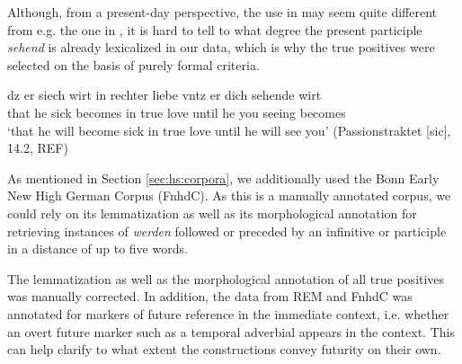 \documentclass[output=paper,colorlinks,citecolor=brown]{langscibook}
\begin{document}
Although, from a present-day perspective, the use in  may seem quite different from e.g. the one in , it is hard to tell to what degree the present participle \textit{sehend} is already lexicalized in our data, which is why the true positives were selected on the basis of purely formal criteria. 

\ea \label{ex:hs:liebesehend}
\gll dz er siech wirt in rechter liebe vntz er dich sehende wirt \\
that he sick becomes in true love until he you seeing becomes \\
\glt `that he will become sick in true love until he will see you' (Passionstraktet [sic], 14.2, REF)
\z

As mentioned in Section \ref{sec:hs:corpora}, we additionally used the Bonn Early New High German Corpus (FnhdC). As this is a manually annotated corpus, we could rely on its lemmatization as well as its morphological annotation for retrieving instances of \textit{werden} followed or preceded by an infinitive or participle in a distance of up to five words. 

The lemmatization as well as the morphological annotation of all true positives was manually corrected. In addition, the data from REM and FnhdC was annotated for markers of future reference in the immediate context, i.e. whether an overt future marker such as a temporal adverbial appears in the context. This can help clarify to what extent the constructions convey futurity on their own.


\begin{table}
\caption{Overview of the true positives across the three corpora, including hits with \textit{werden} in the past tense (excluded from the further analysis, hence greyed out).}
\label{tab:hs:overview}
\end{table}
\end{document}
